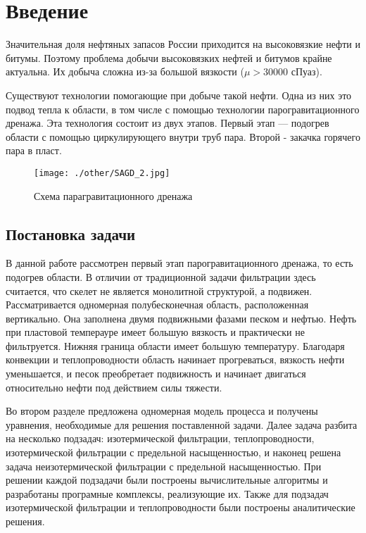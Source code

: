 \documentclass[12pt,a4paper]{article}
\begin{document}
\newpage
\tableofcontents
\newpage
\section{Введение}


Значительная доля нефтяных запасов России приходится на высоковязкие нефти и битумы. Поэтому проблема добычи высоковязких нефтей и битумов крайне актуальна. Их добыча сложна из-за большой вязкости ($\mu > 30000 $ сПуаз). 

Существуют технологии помогающие при добыче такой нефти. Одна из них это подвод тепла к области, в том числе с помощью технологии парогравитационного дренажа. Эта технология состоит из двух этапов. Первый этап — подогрев области с помощью циркулирующего внутри труб пара. Второй - закачка горячего пара в пласт.

\begin{figure}[h!]
\begin{center}
\texttt{[image: ./other/SAGD\_2.jpg]}
\caption{Схема парагравитационного дренажа}
\end{center}
\end{figure}

\subsection {Постановка задачи}

В данной работе рассмотрен первый этап парогравитационного дренажа, то есть подогрев области. В отличии от традиционной задачи фильтрации здесь считается, что скелет не является монолитной структурой, а подвижен. Рассматривается одномерная полубесконечная область, расположенная вертикально. Она заполнена двумя подвижными фазами песком и нефтью. Нефть при пластовой темперауре имеет большую вязкость и практически не фильтруется. Нижняя граница области имеет большую температуру. Благодаря конвекции и теплопроводности область начинает прогреваться, вязкость нефти уменьшается, и песок преобретает подвижность и начинает двигаться относительно нефти под действием силы тяжести.

Во втором разделе предложена одномерная модель процесса  и получены уравнения, необходимые для решения поставленной задачи. Далее задача разбита на несколько подзадач: изотермической фильтрации, теплопроводности, изотермической фильтрации с предельной насыщенностью, и наконец решена задача неизотермической фильтрации с предельной насыщенностью. При решении каждой подзадачи были построены вычислительные алгоритмы и разработаны програмные комплексы, реализующие их. Также для подзадач изотермической фильтрации и теплопроводности были построены аналитические решения.
\end{document}
